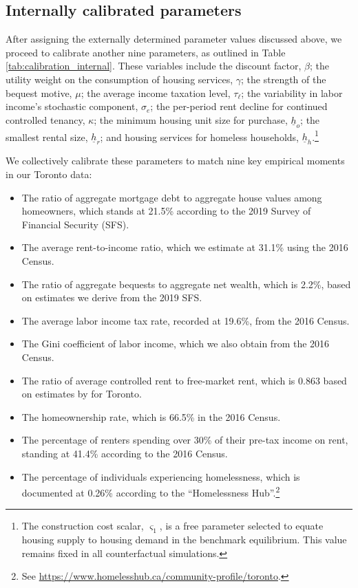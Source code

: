 \documentclass[parskip=full]{article}
\begin{document}
\subsection{Internally calibrated parameters}\label{sec:internal_calibration}

After assigning the externally determined parameter values discussed above, we proceed to calibrate another nine parameters, as outlined in Table \ref{tab:calibration_internal}. These variables include the discount factor, $\beta$; the utility weight on the consumption of housing services, $\gamma$; the strength of the bequest motive, $\mu$; the average income taxation level, $\tau_{\ell}$; the variability in labor income's stochastic component, $\sigma_{e}$; the per-period rent decline for continued controlled tenancy, $\kappa$; the minimum housing unit size for purchase, $\underline{h}_{o}$; the smallest rental size, $\underline{h}_{r}$; and housing services for homeless households, $\underline{h}_{h}$.\footnote{The construction cost scalar, $\varsigma_{1}$, is a free parameter selected to equate housing supply to housing demand in the benchmark equilibrium. This value remains fixed in all counterfactual simulations.}

We collectively calibrate these parameters to match nine key empirical moments in our Toronto data:

\begin{itemize}
    \item The ratio of aggregate mortgage debt to aggregate house values among homeowners, which stands at 21.5\% according to the 2019 Survey of Financial Security (SFS).
    \item The average rent-to-income ratio, which we estimate at 31.1\% using the 2016 Census.
    \item The ratio of aggregate bequests to aggregate net wealth, which is 2.2\%, based on estimates we derive from the 2019 SFS.
    \item The average labor income tax rate, recorded at 19.6\%, from the 2016 Census.
    \item The Gini coefficient of labor income, which we also obtain from the 2016 Census.
    \item The ratio of average controlled rent to free-market rent, which is 0.863 based on estimates by \citet{zhang-gou} for Toronto.
    \item The homeownership rate, which is 66.5\% in the 2016 Census.
    \item The percentage of renters spending over 30\% of their pre-tax income on rent, standing at 41.4\% according to the 2016 Census.
    \item The percentage of individuals experiencing homelessness, which is documented at 0.26\% according to the ``Homelessness Hub''.\footnote{See \url{https://www.homelesshub.ca/community-profile/toronto}.}
\end{itemize}
\end{document}

